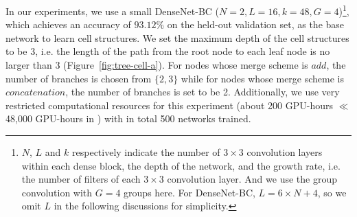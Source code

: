 \documentclass{article}
\makeatletter
\newcommand{\tabincell}[2]{\begin{tabular}{@{}#1@{}}#2\end{tabular}}
\makeatother
\begin{document}

In our experiments, we use a small DenseNet-BC ($N = 2, L = 16, k = 48, G = 4$)\footnote{$N$, $L$ and $k$ respectively indicate the number of $3 \times 3$ convolution layers within each dense block, the depth of the network, and the growth rate, i.e. the number of filters of each $3 \times 3$ convolution layer. And we use the group convolution with $G = 4$ groups here.
For DenseNet-BC, $L = 6 \times N + 4$, so we omit $L$ in the following discussions for simplicity.}, 
which achieves an accuracy of $93.12\%$ on the held-out validation set, as the base network to learn cell structures. We set the maximum depth of the cell structures to be 3, i.e. the length of the path from the root node to each leaf node is no larger than 3 (Figure~\ref{fig:tree-cell-a}). For nodes whose merge scheme is $add$, the number of branches is chosen from $\{2, 3\}$ while for nodes whose merge scheme is $concatenation$, the number of branches is set to be 2. Additionally, we use very restricted computational resources for this experiment (about 200 GPU-hours $\ll$ 48,000 GPU-hours in \citet{zoph2017learning}) with in total 500 networks trained. 
\end{document}
